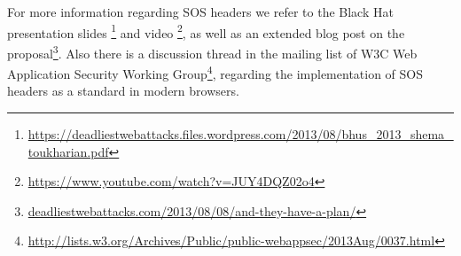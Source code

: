 For more information regarding SOS headers we refer to the Black Hat presentation
slides
\footnote{\url{https://deadliestwebattacks.files.wordpress.com/2013/08/bhus_2013_shema_toukharian.pdf}}
and video \footnote{\url{https://www.youtube.com/watch?v=JUY4DQZ02o4}}, as well
as an extended blog post on the
proposal\footnote{\url{deadliestwebattacks.com/2013/08/08/and-they-have-a-plan/}}.
Also there is a discussion thread in the mailing list of W3C Web Application
Security Working
Group\footnote{\url{http://lists.w3.org/Archives/Public/public-webappsec/2013Aug/0037.html}},
regarding the implementation of SOS headers as a standard in modern browsers.
